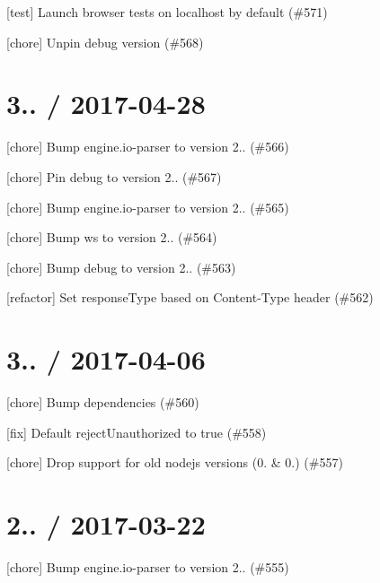 
\begin{DoxyItemize}
\item \mbox{[}test\mbox{]} Launch browser tests on localhost by default (\#571)
\item \mbox{[}chore\mbox{]} Unpin debug version (\#568)
\end{DoxyItemize}

\section*{3.. / 2017-\/04-\/28 }


\begin{DoxyItemize}
\item \mbox{[}chore\mbox{]} Bump engine.\+io-\/parser to version 2.. (\#566)
\item \mbox{[}chore\mbox{]} Pin debug to version 2.. (\#567)
\item \mbox{[}chore\mbox{]} Bump engine.\+io-\/parser to version 2.. (\#565)
\item \mbox{[}chore\mbox{]} Bump ws to version 2.. (\#564)
\item \mbox{[}chore\mbox{]} Bump debug to version 2.. (\#563)
\item \mbox{[}refactor\mbox{]} Set response\+Type based on \textquotesingle{}Content-\/\+Type\textquotesingle{} header (\#562)
\end{DoxyItemize}

\section*{3.. / 2017-\/04-\/06 }


\begin{DoxyItemize}
\item \mbox{[}chore\mbox{]} Bump dependencies (\#560)
\item \mbox{[}fix\mbox{]} Default {\ttfamily reject\+Unauthorized} to {\ttfamily true} (\#558)
\item \mbox{[}chore\mbox{]} Drop support for old nodejs versions (0. \& 0.) (\#557)
\end{DoxyItemize}

\section*{2.. / 2017-\/03-\/22 }


\begin{DoxyItemize}
\item \mbox{[}chore\mbox{]} Bump engine.\+io-\/parser to version 2.. (\#555)
\end{DoxyItemize}

